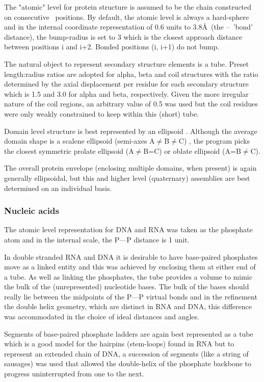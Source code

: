 The "atomic" level for protein structure is assumed to be the chain constructed on
consecutive \CA\ positions.   By default, the atomic level is always a hard-sphere
and in the internal coordinate representation of 0.6 units to 3.8\AA\ (the \CA--\CA\
'bond' distance), the bump-radius is set to 3 which is the closest approach distance 
between positions i and i+2.   Bonded positions (i, i+1) do not bump.  

The natural object to represent secondary structure elements is a tube.   Preset
length:radius ratios are adopted for alpha, beta and coil structures with the ratio
determined by the axial displacement per residue for each secondary structure which
is 1.5 and 3.0 for alpha and beta, respectively.   Given the more irregular nature
of the coil regions, an arbitrary value of 0.5 was used but the coil residues were
only weakly constrained to keep within this (short) tube.

Domain level structure is best represented by an ellipsoid \cite{TaylorWRet83b}.  
Although the average domain shape is a scalene ellipsoid (semi-axes A$\ne$B$\ne$C)
\cite{AszodiAet94a}, the program picks
the closest symmetric prolate ellipsoid (A$\ne$B=C) or oblate ellipsoid (A=B$\ne$C).

The overall protein envelope (enclosing multiple domains, when present) is again generally
ellipsoidal, but this and higher level (quaternary) assemblies are best determined on an individual basis.

\subsubsection{Nucleic acids}

The atomic level representation for DNA and RNA was taken as the phosphate atom
and in the internal scale, the P---P distance is 1 unit.

In double stranded RNA and DNA it is desirable to have base-paired phosphates
move as a linked entity and this was achieved by enclosing them at either end of
a tube.  As well as linking the phosphates, the tube provides a volume to mimic
the bulk of the (unrepresented) nucleotide bases.   The bulk of the bases should
really lie between the midpoints of the P---P virtual bonds and in the refinement the
double helix geometry, which are distinct in RNA and DNA, this difference
was accommodated in the choice of ideal distances and angles.

Segments of base-paired phosphate ladders are again best represented as a tube
which is a good model for the hairpins (stem-loops) found in RNA but to represent an extended
chain of DNA, a succession of segments (like a string of sausages) was used that allowed the
double-helix of the phosphate backbone to progress uninterrupted from one to the next.
